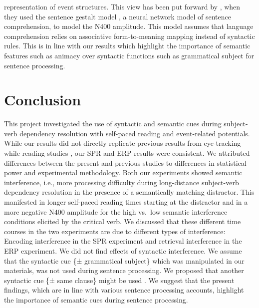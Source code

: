 \documentclass[a4paper, man, floatsintext]{apa7}
\begin{document}
representation of event structures. This view has been put forward by \citet{rabovsky_etal_2018}, when they used the sentence gestalt model \citep{mcclelland1989_sentence_gestalt}, a neural network model of sentence comprehension, to model the N400 amplitude. This model assumes that language comprehension relies on associative form-to-meaning mapping instead of syntactic rules. This is in line with our results which highlight the importance of semantic features such as animacy over syntactic functions such as grammatical subject for sentence processing.


\section{Conclusion}

This project investigated the use of  syntactic and semantic cues during subject-verb dependency resolution with self-paced reading and event-related potentials. While our results did not directly replicate previous results from eye-tracking while reading studies \citep{vandyke07, mertzen}, our SPR and ERP results were consistent. We attributed differences between the present and previous studies to differences in statistical power and experimental methodology. Both our experiments showed semantic interference, i.e., more processing difficulty during long-distance subject-verb dependency resolution in the presence of a semantically matching distractor. This manifested in longer self-paced reading times starting at the distractor and in a more negative N400 amplitude for the high vs.\ low semantic interference conditions elicited by the critical verb. We discussed that these different time courses in the two experiments are due to different types of interference: Encoding interference in the SPR experiment and retrieval interference in the ERP experiment. We did not find effects of syntactic interference. We assume that the syntactic cue \{± grammatical subject\} which was manipulated in our materials, was not used during sentence processing. We proposed that another syntactic cue \{± same clause\} might be used \citep[see also][]{mertzen}. We suggest that the present findings, which are in line with various sentence processing accounts, highlight the importance of semantic cues during sentence processing. 
\end{document}
